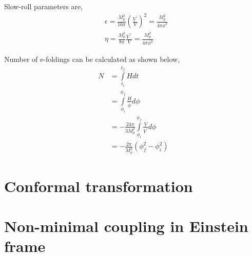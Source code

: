 Slow-roll parameters are,
\begin{align}
&\epsilon = \frac{M_{p}^{2}}{16\pi}\left(\frac{V^{\prime}}{V}\right)^{2} = \frac{M_{p}^{2}}{4\pi \phi^{2}}\\
&\eta = \frac{M_{p}^{2}}{8\pi}\frac{V^{\prime\prime}}{V} = \frac{M_{p}^{2}}{4\pi\phi^{2}}
\end{align}

Number of e-foldings can be calculated as shown below,
\begin{align}
N &= \int\limits_{t_{i}}^{t_{f}}Hdt\\
&= \int\limits_{\phi_{i}}^{\phi_{f}}\frac{H}{\dot{\phi}}d\phi\\
&= -\frac{24\pi}{3M_{p}^{2}}\int\limits_{\phi_{i}}^{\phi_{f}}\frac{V}{V^{\prime}}d\phi\\
&= -\frac{2\pi}{M_{p}^{2}}\left(\phi_{f}^{2} - \phi_{i}^{2}\right)
\end{align}

\section{Conformal transformation}


\section{Non-minimal coupling in Einstein frame}


